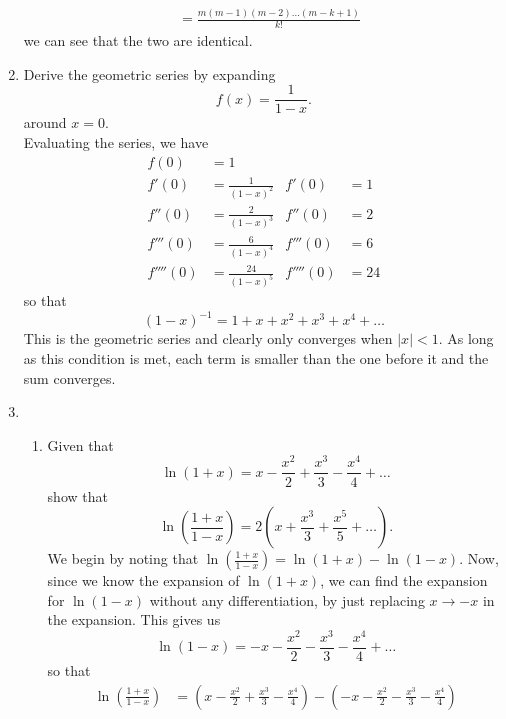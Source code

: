 \documentclass{article}
\begin{document}
\begin{enumerate}
{\begin{align*}
			&= \frac{m (m-1) (m-2) \ldots (m -k +1)}{k!}
		\end{align*}
		we can see that the two are identical.
	}
	\item{Derive the geometric series by expanding
		\begin{equation*}
			f(x) = \frac{1}{1-x}.
		\end{equation*}
		around $x=0$. \\
		Evaluating the series, we have 
		\begin{align*}
			f(0) &= 1 \\
			f'(0) &= \frac{1}{(1-x)^2} & f'(0) &= 1 \\
			f''(0) &= \frac{2}{(1-x)^3} & f''(0) &= 2 \\
			f'''(0) &= \frac{6}{(1-x)^4} & f'''(0) &= 6 \\
			f''''(0) &= \frac{24}{(1-x)^5} & f''''(0) &= 24
		\end{align*}
		so that 
		\begin{equation*}
			(1-x)^{-1} = 1 + x + x^2 + x^3 + x^4 + \ldots 
		\end{equation*}
		This is the geometric series and clearly only converges when $|x| < 1$.  As long as this condition is met, each term is smaller than the one before it and the sum converges.  
	}
	\item{}
	\begin{enumerate}
		\item{Given that 
			\begin{equation*}
				\ln (1+x) = x - \frac{x^2}{2} + \frac{x^3}{3} - \frac{x^4}{4} + \ldots
			\end{equation*}
			show that 
			\begin{equation*}
				\ln \left( \frac{1+x}{1-x} \right) = 2\left( x + \frac{x^3}{3} + \frac{x^5}{5} + \ldots \right) .
			\end{equation*}
			We begin by noting that $\ln \left( \frac{1+x}{1-x} \right) = \ln (1+x) - \ln (1-x)$.  Now, since we know the expansion of $\ln (1+x)$, we can find the expansion for $\ln (1-x)$ without any differentiation, by just replacing $x \rightarrow -x$ in the expansion.  This gives us 
			\begin{equation*}
				\ln (1-x) = -x - \frac{x^2}{2} - \frac{x^3}{3} - \frac{x^4}{4} + \ldots
			\end{equation*}
			so that 
			\begin{align*}
				\ln \left( \frac{1+x}{1-x} \right) &= \left( x - \frac{x^2}{2} + \frac{x^3}{3} - \frac{x^4}{4} \right) - \left( -x - \frac{x^2}{2} - \frac{x^3}{3} - \frac{x^4}{4} \right) \\

\end{align*}}
\end{enumerate}
\end{enumerate}
\end{document}
